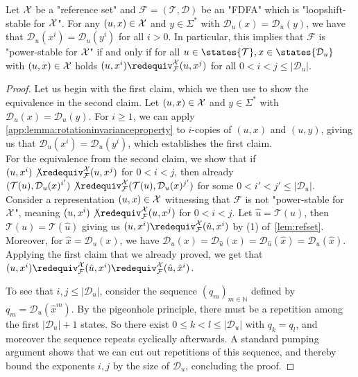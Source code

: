 \documentclass[a4paper,USenglish,cleveref,autoref,thm-restate]{lipics-v2021}
\newcommand{\mc}[1]{\ensuremath{\mathcal{#1}}}
\newcommand{\T}{\mc{T}}
\newcommand{\F}{\mc{F}}
\newcommand{\D}{\mc{D}}
\begin{document}
{\begin{lemma}
    Let $\mathcal{X}$ be a "reference set" and $\F = (\T, \D)$ be an "FDFA" which is "loopshift-stable for $\mathcal{X}$".
    For any $(u,x) \in \mathcal{X}$ and $y \in \Sigma^*$ with $\D_u(x) = \D_u(y)$, we have that $\D_u(x^i) = \D_u(y^i)$ for all $i > 0$.
    In particular, this implies that $\F$ is "power-stable for $\mathcal{X}$" if and only if for all $u \in \states{\T}, x \in \states{\D_u}$ with $(u,x) \in \mathcal{X}$ holds $(u,x^i) \redequiv^\X_\F (u,x^j)$ for all $0 < i < j \leq |\D_u|$.\label{app:lemma:powerclosednessdecidable}
\end{lemma}
\begin{proof}
    Let us begin with the first claim, which we then use to show the equivalence in the second claim.
    Let $(u,x) \in \mathcal{X}$ and $y \in \Sigma^*$ with $\D_u(x) = \D_u(y)$.
    For $i \geq 1$, we can apply \cref{app:lemma:rotationinvarianceproperty} to $i$-copies of $(u,x)$ and $(u,y)$, giving us that $\D_u(x^i) = \D_u(y^i)$, which establishes the first claim.\\
    For the equivalence from the second claim, we show that if $(u, x^i) \not\redequiv^\X_\F (u,x^j)$ for $0 < i < j$, then already $(\T(u),\D_u(x)^{i'}) \not\redequiv^\X_\F (\T(u),\D_u(x)^{j'})$ for some $0 < i' < j' \leq |\D_u|$.
    Consider a representation $(u,x) \in \mathcal{X}$ witnessing that $\F$ is not "power-stable for $\mathcal{X}$", meaning $(u, x^i) \not\redequiv^\X_\F (u,x^j)$ for $0 < i < j$.
    Let $\hat{u} = \T(u)$, then $\T(u) = \T(\hat{u})$ giving us $(u, x^i) \redequiv^\X_\F (\hat{u}, x^i)$ by (1) of~\cref{lem:refset}.
    Moreover, for $\hat{x} = \D_u(x)$, we have $\D_u(x) = \D_{\hat{u}}(x) = \D_{\hat{u}}(\hat{x}) = \D_u(\hat{x})$.
    Applying the first claim that we already proved, we get that $(u,x^i) \redequiv^\X_\F (\hat{u}, x^i) \redequiv^\X_\F (\hat{u}, \hat{x}^i)$.
    
    To see that $i,j \leq |\D_u|$, consider the sequence $(q_m)_{m \in \mathbb{N}}$ defined by $q_m = \D_u(\hat{x}^m)$.
    By the pigeonhole principle, there must be a repetition among the first $|\D_u| + 1$ states.
    So there exist $0 \leq k < l \leq |\D_u|$ with $q_k = q_l$, and moreover the sequence repeats cyclically afterwards.
    A standard pumping argument shows that we can cut out repetitions of this sequence, and thereby bound the exponents $i,j$ by the size of $\D_u$, concluding the proof.
\end{proof}

}
\end{document}
